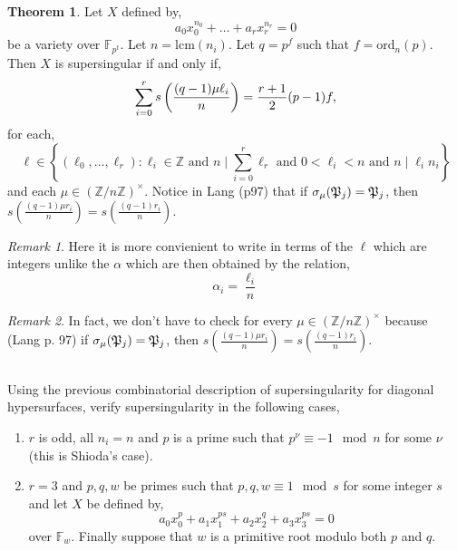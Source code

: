 \documentclass[12pt]{article}
\newcommand{\Z}{\mathbb{Z}}
\newcommand{\FF}{\mathbb{F}}
\newcommand{\divides}{\mid}
\theoremstyle{remark}
\newtheorem*{rmk}{Remark}
\theoremstyle{definition}
\newtheorem{theorem}{Theorem}[subsection]
\newcommand{\lcm}{\mathrm{lcm}}
\begin{document}
\begin{theorem}\label{thm:gauss_factor_SS}
Let $X$ defined by,
\[ a_0 x_0^{n_0} + \dots + a_r x_r^{n_r} = 0 \]
be a variety over $\FF_{p^t}$. Let $n = \lcm(n_i)$. Let $q = p^f$ such that $f = \text{ord}_n(p)$. Then $X$ is supersingular if and only if,
\[ \sum_{i = 0}^{r} s\left(  \frac{(q-1)\mu \ell_i}{n}  \right) = \frac{r+1}{2}(p - 1)f,\]
for each,
\[ \ell \in \left\{(\ell_0, \dots, \ell_r) : \ell_i \in \Z \text{ and } n \divides \sum_{i = 0}^{r} \ell_r \text{ and } 0 < \ell_i < n \text{ and } n \divides \ell_i n_i \right\} \]
and each $\mu \in (\Z/n\Z)^\times$. Notice in Lang (p97) that if $\sigma_\mu(\mathfrak{P}_j) = \mathfrak{P}_j$, then $s\left(\frac{(q-1)\mu r_i}{n}\right) = s\left(\frac{(q-1) r_i}{n}\right)$.
\end{theorem}

\begin{rmk}
Here it is more convienient to write in terms of the $\ell$ which are integers unlike the $\alpha$ which are then obtained by the relation,
\[ \alpha_i = \frac{\ell_i}{n} \] 
\end{rmk}

\begin{rmk}
In fact, we don't have to check for every $\mu \in (\Z / n \Z)^\times$ because (Lang p. 97) if $\sigma_\mu(\mathfrak{P}_j) = \mathfrak{P}_j$, then $s\left(\frac{(q-1)\mu r_i}{n}\right) = s\left(\frac{(q-1) r_i}{n}\right)$.
\end{rmk}


\subsection{}

Using the previous combinatorial description of supersingularity for diagonal hypersurfaces, verify supersingularity in the following cases,
\begin{enumerate}
\item $r$ is odd, all $n_i = n$ and $p$ is a prime such that $p^\nu \equiv -1 \mod n$ for some $\nu$ (this is Shioda's case).

\item $r = 3$ and $p,q,w$ be primes such that $p,q,w \equiv 1 \mod s$ for some integer $s$ and let $X$ be defined by,
\[ a_0 x_0^p + a_1 x_1^{ps} + a_2 x_2^q + a_3 x_3^{ps} = 0 \]
over $\FF_w$. Finally suppose that $w$ is a primitive root modulo both $p$ and $q$.
\end{enumerate}

\printbibliography
\end{document}
